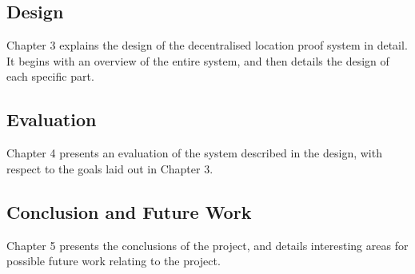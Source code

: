 \subsection{Design}
Chapter 3 explains the design of the decentralised location proof system in detail. It begins with an overview of the entire system, and then details the design of each specific part.

\subsection{Evaluation}
Chapter 4 presents an evaluation of the system described in the design, with respect to the goals laid out in Chapter 3.

\subsection{Conclusion and Future Work}
Chapter 5 presents the conclusions of the project, and details interesting areas for possible future work relating to the project.